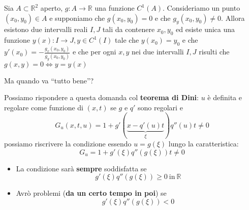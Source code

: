 \documentclass[10pt,a4paper,twoside,openright]{book}
\begin{document}
\begin{theorem}
	 Sia $A\subset \mathbb{R}^2$ aperto, $g:A\to \mathbb{R} $ una funzione $C^{1}(A) $. Consideriamo un punto $(x_{0},y_{0})\in A$ e supponiamo che $g(x_{0},y_{0})=0$ e che $g_{y}(x_{0},y_{0})\neq 0$. Allora esistono due intervalli reali $I,J$ tali da contenere $x_{0},y_{0}$ ed esiste unica una funzione $y(x):I\to J, y\in C^{1}(I) $ tale che $y(x_{0})=y_{0}$ e che $y'(x_{0})=-\frac{g_{x}(x_{0},y_{0})}{g_{y}(x_{0},y_{0})}$ e che per ogni $x,y$ nei due intervalli $I,J$ risulti che $g(x,y)=0 \Leftrightarrow y=y(x)$
\end{theorem}

Ma quando va ``tutto bene''?

Possiamo rispondere a questa domanda col \textbf{teorema di Dini}: $u$ è definita e regolare come funzione di $(x,t)$ se $g$ e $q'$ sono regolari e 
\begin{equation*}
	G_{u}(x,t,u) =1+g'(\underbrace{x-q'(u) t}_{\xi }) q''(u) t\neq 0
\end{equation*}
possiamo riscrivere la condizione essendo $\displaystyle u=g(\xi)$ lungo la caratteristica:
\begin{equation}
	\boxed{G_{u} =1+g'(\xi) q''(g(\xi)) t\neq 0}
\end{equation}
\begin{itemize}
	\item La condizione sarà \textbf{sempre} soddisfatta se
	\begin{equation*}
	      g'(\xi) q''(g(\xi)) \geqslant 0\ \text{in} \ \mathbb{R}
		\label{eq:condizione-tutto-bene}
	\end{equation*}
	\item Avrò problemi (\textbf{da un certo tempo in poi}) se
	\begin{equation*}
	      g'(\xi) q''(g(\xi)) < 0
	\end{equation*}
\end{itemize}
\end{document}
